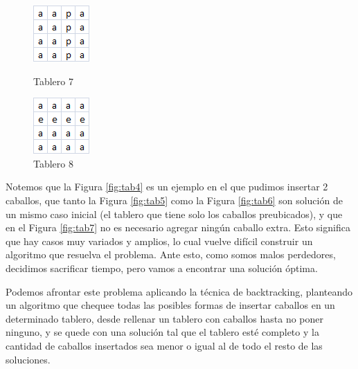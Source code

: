 \begin{figure}[!htb]
  \includegraphics[scale=1]{imagenes/tab7.png}
  \caption{Tablero 7}\label{fig:tab7}
\endminipage
{}
  \includegraphics[scale=1]{imagenes/tab8.png}
  \caption{Tablero 8}\label{fig:tab8}
\endminipage
\end{figure}



Notemos que la Figura \ref{fig:tab4} es un ejemplo en el que pudimos insertar 2 caballos, que tanto la Figura \ref{fig:tab5} como la Figura \ref{fig:tab6} son solución de un mismo caso inicial (el tablero que tiene solo los caballos preubicados), y que en el Figura \ref{fig:tab7} no es necesario agregar ningún caballo extra. Esto significa que hay casos muy variados y amplios, lo cual vuelve difícil construir un algoritmo que resuelva el problema. Ante esto, como somos malos perdedores, decidimos sacrificar tiempo, pero vamos a encontrar una solución óptima.

Podemos afrontar este problema aplicando la técnica de backtracking, planteando un algoritmo que chequee todas las posibles formas de insertar caballos en un determinado tablero, desde rellenar un tablero con caballos hasta no poner ninguno, y se quede con una solución tal que el tablero esté completo y la cantidad de caballos insertados sea menor o igual al de todo el resto de las soluciones.

